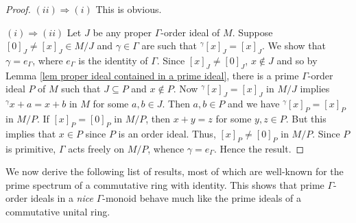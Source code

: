 \documentclass[a4paper,reqno,12pt]{amsart}
\numberwithin{equation}{section}
\theoremstyle{definition}
\theoremstyle{remark}
\begin{document}
\begin{proof}
$(ii)\Rightarrow (i)$ This is obvious.

$(i)\Rightarrow (ii)$ Let $J$ be any proper $\Gamma$-order ideal of $M$. Suppose $[0]_J\neq [x]_J\in M/{J}$ and $\gamma\in \Gamma$ are such that $^\gamma [x]_J=[x]_J$. We show that $\gamma=e_\Gamma$, where $e_\Gamma$ is the identity of $\Gamma$. Since $[x]_J\neq [0]_J$, $x\notin J$ and so by Lemma \ref{lem proper ideal contained in a prime ideal}, there is a prime $\Gamma$-order ideal $P$ of $M$ such that $J\subseteq P$ and $x\notin P$. Now $^\gamma [x]_J=[x]_J$ in $M/{J}$ implies $^\gamma x+a=x+b$ in $M$ for some $a,b\in J$. Then $a,b\in P$ and we have $^\gamma [x]_P=[x]_P$ in $M/{P}$. If $[x]_P=[0]_P$ in $M/{P}$, then $x+y=z$ for some $y,z\in P$. But this implies that $x\in P$ since $P$ is an order ideal. Thus, $[x]_P\neq [0]_P$ in $M/{P}$. Since $P$ is primitive, $\Gamma$ acts freely on $M/{P}$, whence $\gamma=e_\Gamma$. Hence the result. 
\end{proof}

We now derive the following list of results, most of which are well-known for the prime spectrum of a commutative ring with identity. This shows that prime $\Gamma$-order ideals in a \emph{nice} $\Gamma$-monoid behave much like the prime ideals of a commutative unital ring. 
\end{document}
